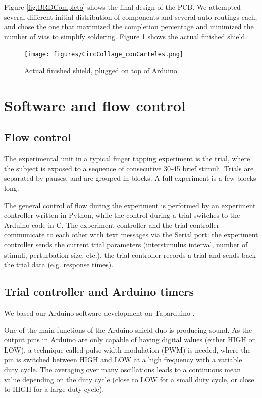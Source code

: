 \documentclass[twocolumn]{article}
\begin{document}
Figure \ref{fig.BRDCompleto} shows the final design of the PCB. We attempted several different initial distribution of components and several auto-routings each, and chose the one that maximized the completion percentage and minimized the number of vias to simplify soldering. Figure \ref{fig.HardwareFinal} shows the actual finished shield.



\begin{figure}[!ht]
    \centering
    \texttt{[image: figures/CircCollage\_conCarteles.png]}
    \caption{Actual finished shield, plugged on top of Arduino.}
    \label{fig.HardwareFinal}
\end{figure}






\section{Software and flow control}

\subsection{Flow control}

The experimental unit in a typical finger tapping experiment is the trial, where the subject is exposed to a sequence of consecutive 30-45 brief stimuli. Trials are separated by pauses, and are grouped in blocks. A full experiment is a few blocks long.

The general control of flow during the experiment is performed by an experiment controller written in Python, while the control during a trial switches to the Arduino code in C. The experiment controller and the trial controller communicate to each other with text messages via the Serial port: the experiment controller sends the current trial parameters (interstimulus interval, number of stimuli, perturbation size, etc.), the trial controller records a trial and sends back the trial data (e.g. response times).



\subsection{Trial controller and Arduino timers}
\label{sec.timers}

We based our Arduino software development on Taparduino \cite{Schultz2016}.

One of the main functions of the Arduino-shield duo is producing sound. As the output pins in Arduino are only capable of having digital values (either HIGH or LOW), a technique called pulse width modulation (PWM) is needed, where the pin is switched between HIGH and LOW at a high frequency with a variable duty cycle. The averaging over many oscillations leads to a continuous mean value depending on the duty cycle (close to LOW for a small duty cycle, or close to HIGH for a large duty cycle).
\end{document}
